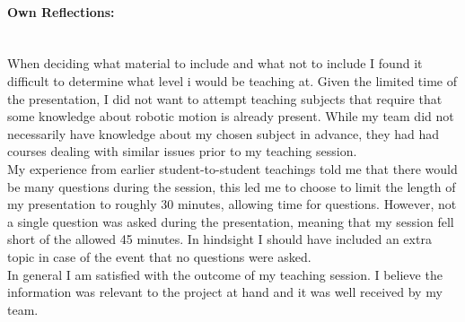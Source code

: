 \documentclass[11pt,a4paper]{article}
\begin{document}
\paragraph{Own Reflections:}~\\
When deciding what material to include and what not to include I found it difficult to determine what level i would be teaching at. Given the limited time of the presentation, I did not want to attempt teaching subjects that require that some knowledge about robotic motion is already present. While my team did not necessarily have knowledge about my chosen subject in advance, they had had courses dealing with similar issues prior to my teaching session.\\
My experience from earlier student-to-student teachings told me that there would be many questions during the session, this led me to choose to  limit the length of my presentation to roughly 30 minutes, allowing time for questions. However, not a single question was asked during the presentation, meaning that my session fell short of the allowed 45 minutes. In hindsight I should have included an extra topic in case of the event that no questions were asked.\\
In general I am satisfied with the outcome of my teaching session. I believe the information was relevant to the project at hand and it was well received by my team.
\end{document}
